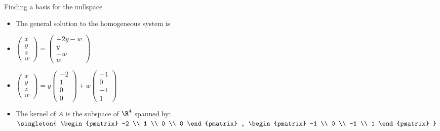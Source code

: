 \documentclass{beamer}
\begin{document}
\begin{frame}{Finding a basis for the nullspace}

\begin{itemize}
\item The general solution to the homogeneous system is
\item
$
\begin{pmatrix}
x \\ y \\ z \\ w
\end{pmatrix}
=
\begin{pmatrix}
-2y - w \\
y \\
-w \\
w
\end{pmatrix}
$
\item
$
\begin{pmatrix}
x \\ y \\ z \\ w
\end{pmatrix}
=
y
\begin{pmatrix}
-2 \\
1 \\
0 \\
0
\end{pmatrix}
+
w
\begin{pmatrix}
-1 \\
0 \\
-1 \\
1
\end{pmatrix}
$
\item The kernel of $A$ is the subspace of $\R^4$ spanned by:
$
\singleton{
\begin{pmatrix}
-2 \\
1 \\
0 \\
0
\end{pmatrix}
,
\begin{pmatrix}
-1 \\
0 \\
-1 \\
1
\end{pmatrix}
}
$
\end{itemize}
\end{frame}
\end{document}
